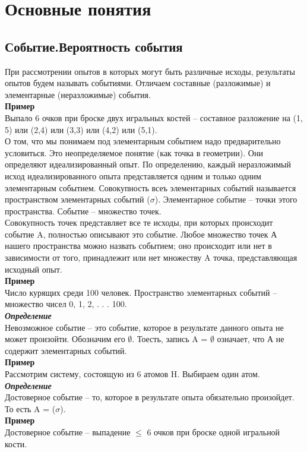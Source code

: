 \documentclass[russian, 12pt]{article}
\begin{document}
\section{Основные понятия}
\subsection{Событие.Вероятность события}
При рассмотрении опытов в которых могут быть различные исходы, результаты опытов будем называть событиями. Отличаем составные (разложимые) и элементарные (неразложимые) события.\\
\textbf{Пример} \\Выпало 6 очков при броске двух игральных костей -- составное разложение на (1, 5) или (2,4) или (3,3) или (4,2) или (5,1). \\
О том, что мы понимаем под элементарным событием надо предварительно условиться. Это неопределяемое понятие (как точка в геометрии). Они определяют идеализированный опыт. По определению, каждый  неразложимый исход идеализированного опыта представляется одним и только одним элементарным событием. Совокупность всеъ элементарных событий называется пространством элементарных событий  ($\sigma$). Элементарное событие -- точки этого пространства. Событие -- множество точек.\\
Совокупность точек представляет все те исходы, при которых происходит событие A, полностью описывают это событие. Любое множество точек А нашего пространства можно назвать событием; оно происходит или нет в зависимости от того, принадлежит или нет множеству A точка, представляющая исходный опыт.\\
\textbf{Пример}\\ Число курящих среди 100 человек. Пространство элементарных событий -- множество чисел 0, 1, 2,  . . . 100.\\
\textit{\textbf{Определение}}\\Невозможное событие -- это событие, которое в результате данного опыта не может произойти. Обозначим его $\emptyset$. Тоесть, запись A = $\emptyset$ означает, что А не содержит элементарных событий.\\
\textbf{Пример}\\Рассмотрим систему, состоящую из 6 атомов H. Выбираем один атом.\\
\textit{\textbf{Определение}} \\Достоверное событие -- то, которое в результате опыта  обязательно произойдет. То есть A = ($\sigma$).\\
\textbf{Пример}\\Достоверное событие -- выпадение $\leq$ 6 очков при броске одной игральной кости.\\
\end{document}

